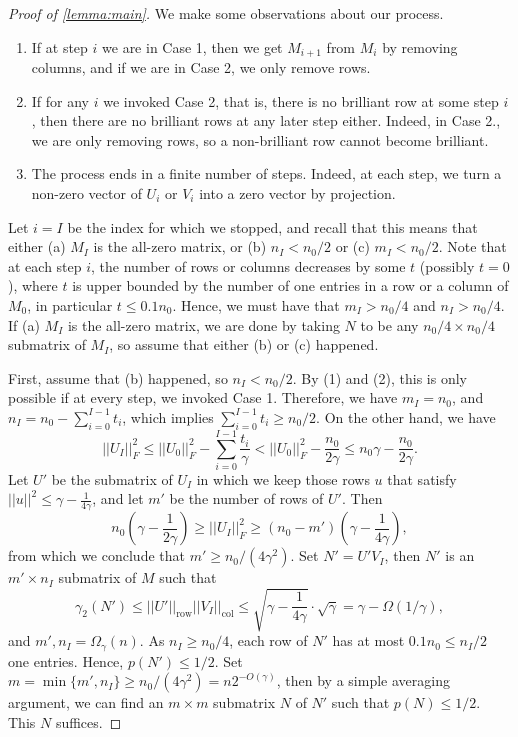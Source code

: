 \documentclass[11pt]{amsart}
\theoremstyle{plain}
\theoremstyle{definition}
\DeclareMathOperator{\row}{row}
\DeclareMathOperator{\col}{col}
\begin{document}
\begin{proof}[Proof of \cref{lemma:main}]
\medskip

We make some observations about our process.
\begin{enumerate}
    \item If at step $i$ we are in Case 1, then we get $M_{i+1}$ from $M_i$ by removing columns, and if we are in Case 2, we only remove rows.
    \item If for any $i$ we invoked Case 2, that is, there is no brilliant row at some step $i$, then there are no brilliant rows at any later step either. Indeed, in Case 2., we are only removing rows, so a non-brilliant row cannot become brilliant.
    \item The process ends in a finite number of steps. Indeed, at each step, we turn a non-zero vector of $U_i$ or $V_i$ into a zero vector by projection.
\end{enumerate}  

Let $i=I$ be the index for which we stopped, and recall that this means that either (a) $M_I$ is the all-zero matrix, or (b) $n_I<n_0/2$ or (c) $m_I<n_0/2$. Note that at each step $i$, the number of rows or columns decreases by some $t$ (possibly $t=0$), where $t$ is upper bounded by the number of one entries in a row or a column of $M_0$, in particular $t\leq 0.1n_0$. Hence, we must have that $m_I>n_0/4$ and $n_I>n_0/4$. If (a) $M_I$ is the all-zero matrix, we are done by taking $N$ to be any $n_0/4\times n_0/4$ submatrix of $M_I$, so assume that either (b) or (c) happened.

First, assume that (b) happened, so $n_I<n_0/2$. By (1) and (2), this is only possible if at every step, we invoked Case 1. Therefore, we have $m_I=n_0$, and $n_I=n_0-\sum_{i=0}^{I-1}t_i$, which implies $\sum_{i=0}^{I-1}t_i\geq n_0/2$. On the other hand, we have 
$$||U_{I}||_F^2\leq ||U_0||_F^2-\sum_{i=0}^{I-1}\frac{t_i}{\gamma}<||U_0||_F^2-\frac{n_0}{2\gamma}\leq n_0\gamma-\frac{n_0}{2\gamma}.$$
Let $U'$ be the submatrix of $U_I$ in which we keep those rows $u$ that satisfy $||u||^2\leq \gamma-\frac{1}{4\gamma}$, and let $m'$ be the number of rows of $U'$. Then 
$$n_0\left(\gamma-\frac{1}{2\gamma}\right)\geq ||U_I||_F^2\geq (n_0-m')\left(\gamma-\frac{1}{4\gamma}\right),$$
from which we conclude that $m'\geq n_0/(4\gamma^2)$. Set $N'=U'V_I$, then $N'$ is an $m'\times n_I$ submatrix of $M$ such that 
$$\gamma_2(N')\leq ||U'||_{\row}||V_I||_{\col}\leq \sqrt{\gamma-\frac{1}{4\gamma}}\cdot\sqrt{\gamma}=\gamma-\Omega(1/\gamma),$$ and $m',n_I=\Omega_{\gamma}(n)$. As $n_I\geq n_0/4$, each row of $N'$ has at most $0.1n_0\leq n_I/2$ one entries. Hence, $p(N')\leq 1/2$. Set $m=\min\{m',n_I\}\geq n_0/(4\gamma^2)=n2^{-O(\gamma)}$, then by a simple averaging argument, we can find an $m\times m$ submatrix $N$ of $N'$ such that $p(N)\leq 1/2$. This $N$ suffices.


\end{proof}
\end{document}
